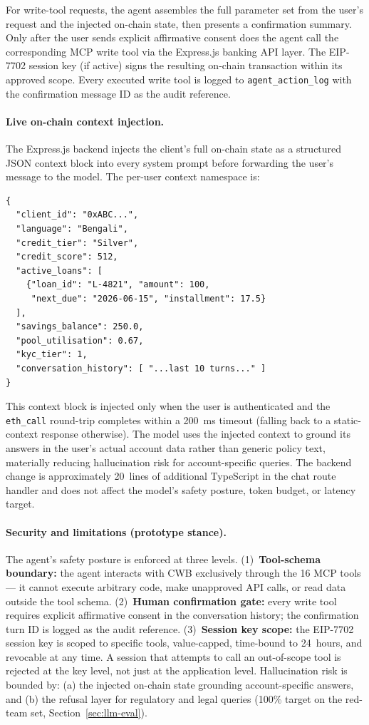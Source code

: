 \documentclass[12pt,a4paper]{report}
\begin{document}
For write-tool requests, the agent assembles the full parameter set from the user's request and the injected on-chain state, then presents a confirmation summary. Only after the user sends explicit affirmative consent does the agent call the corresponding MCP write tool via the Express.js banking API layer. The EIP-7702 session key (if active) signs the resulting on-chain transaction within its approved scope. Every executed write tool is logged to \texttt{agent\_action\_log} with the confirmation message ID as the audit reference.

\paragraph{Live on-chain context injection.}
The Express.js backend injects the client's full on-chain state as a structured JSON context block into every system prompt before forwarding the user's message to the model. The per-user context namespace is:
\begin{verbatim}
{
  "client_id": "0xABC...",
  "language": "Bengali",
  "credit_tier": "Silver",
  "credit_score": 512,
  "active_loans": [
    {"loan_id": "L-4821", "amount": 100,
     "next_due": "2026-06-15", "installment": 17.5}
  ],
  "savings_balance": 250.0,
  "pool_utilisation": 0.67,
  "kyc_tier": 1,
  "conversation_history": [ "...last 10 turns..." ]
}
\end{verbatim}
This context block is injected only when the user is authenticated and the \texttt{eth\_call} round-trip completes within a 200~ms timeout (falling back to a static-context response otherwise). The model uses the injected context to ground its answers in the user's actual account data rather than generic policy text, materially reducing hallucination risk for account-specific queries. The backend change is approximately 20~lines of additional TypeScript in the chat route handler and does not affect the model's safety posture, token budget, or latency target.


\paragraph{Security and limitations (prototype stance).}
The agent's safety posture is enforced at three levels. (1)~\textbf{Tool-schema boundary:} the agent interacts with CWB exclusively through the 16 MCP tools --- it cannot execute arbitrary code, make unapproved API calls, or read data outside the tool schema. (2)~\textbf{Human confirmation gate:} every write tool requires explicit affirmative consent in the conversation history; the confirmation turn ID is logged as the audit reference. (3)~\textbf{Session key scope:} the EIP-7702 session key is scoped to specific tools, value-capped, time-bound to 24~hours, and revocable at any time. A session that attempts to call an out-of-scope tool is rejected at the key level, not just at the application level. Hallucination risk is bounded by: (a) the injected on-chain state grounding account-specific answers, and (b) the refusal layer for regulatory and legal queries (100\% target on the red-team set, Section~\ref{sec:llm-eval}).
\end{document}
